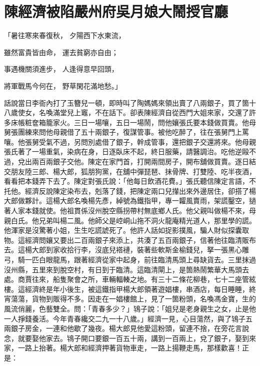 %

\chapter{陳經濟被陷嚴州府\KG 吳月娘大鬧授官廳}

「暑往寒來春復秋，  夕陽西下水東流，

雖然富貴皆由命，  運去貧窮亦自由；

事遇機關須進步，  人逢得意早回頭，

將軍戰馬今何在，  野草閑花滿地愁。」

話說當日李衙內打了玉簪兒一頓，即時叫了陶媽媽來領出賣了八兩銀子，買了箇十八歲使女，名喚滿堂兒上竈，不在話下。卻表陳經濟自從西門大姐來家，交還了許多床帳粧奩箱籠家火。三日一場嚷，五日一場鬧，問他孃張氏要本錢做買賣。他母舅張團練來問他母親借了五十兩銀子，復謀管事。被他吃醉了，往在張舅門上罵嚷。他張舅受氣不過，另問別處借了銀子，幹成管事，還把銀子交還將來。他母親張氏著了一場重氣，染病在身，日逐臥床不起，終日服藥，請醫調治。吃他逆毆不過，兌出兩百兩銀子交他。陳定在家門首，打開兩間房子，開布舖做買賣。逐日結交朋友陸三郎、楊大郎，狐朋狗黨，在舖中彈琵琶、抹骨牌、打雙陸、吃半夜酒，看看把本錢弄下去了。陳定對張氏說：「他每日飲酒花費。」張氏聽信陳定言語，不托他。經濟反說陳定染布去，剋落了錢，把陳定兩口兒攆出來外邊居住，卻搭了楊大郎做夥計。這楊大郎名喚楊先彥，綽號為鐵指甲，專一糶風賣雨，架謊鑿空，撾著人家本錢就使。他祖貫係沒州脫空縣拐帶村無底鄉人氏。他父親叫做楊不來，母親白氏。他兄弟叫楊二風。他師父是崆峒山拖不洞火龍庵精光道人，那里學的謊。他渾家是沒驚著小姐，生生吃謊諕死了。他許人話如捉影撲風，騙人財似探囊取物。這經濟問孃又要出二百兩銀子來添上，共湊了五百兩銀子，信著他往臨清販布去。這楊大郎到家收拾行李，沒底兒褡褳，裝著些軟斯金榆錢兒，拏一張黑心雕弓，騎一匹白眼龍馬，跟著經濟從家中起身，前往臨清馬頭上尋缺貨去。三里抹過沒州縣，五里來到脫空村，有日到于臨清。這臨清閘上，是箇熱鬧繁華大馬頭去處。商賈往來，船隻聚會之所，車輛輻輳之地。有三十二條花柳巷，七十二座管絃樓。這經濟終是年小後生，被這鐵指甲楊大郎領著遊娼樓，串酒店，每日睡睡，終宵蕩蕩，貨物到販得不多。因走在一娼樓館上，見了一箇粉頭，名喚馮金寶，生的風流俏麗，色藝雙全。問：「青春多少？」鴇子說：「姐兒是老身親生之女，止是他一人掙錢養活。今年青春纔交二九一十八歲。」經濟一見，心目蕩然，與了鴇子五兩銀子房金，一連和他歇了幾夜。楊大郎見他愛這粉頭，留連不捨，在旁花言說念，就要娶他家去。鴇子開口要銀一百五十兩，講到一百兩上，兌了銀子，娶到來家，一路上抬著。楊大郎和經濟押著貨物車走，一路上揚鞭走馬，那樣歡喜！正是：

